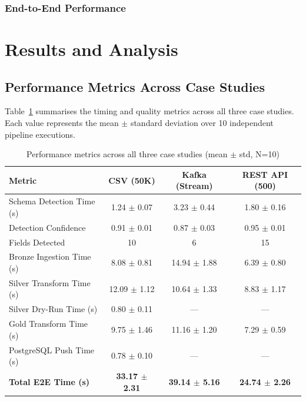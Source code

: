 \documentclass[12pt, a4paper]{article}
\begin{document}
\subsubsection{End-to-End Performance}
\begin{center}
\end{center}


\section{Results and Analysis}

\subsection{Performance Metrics Across Case Studies}

Table~\ref{tab:performance_metrics} summarises the timing and quality metrics across all three case studies. Each value represents the mean $\pm$ standard deviation over 10 independent pipeline executions.

\begin{table}[H]
\centering
\caption{Performance metrics across all three case studies (mean $\pm$ std, N=10)}
\label{tab:performance_metrics}
\renewcommand{\arraystretch}{1.3}
\begin{tabular}{|l|c|c|c|}
\hline
\textbf{Metric} & \textbf{CSV (50K)} & \textbf{Kafka (Stream)} & \textbf{REST API (500)} \\
\hline\hline
Schema Detection Time (s) & 1.24 $\pm$ 0.07 & 3.23 $\pm$ 0.44 & 1.80 $\pm$ 0.16 \\
\hline
Detection Confidence & 0.91 $\pm$ 0.01 & 0.87 $\pm$ 0.03 & 0.95 $\pm$ 0.01 \\
\hline
Fields Detected & 10 & 6 & 15 \\
\hline
Bronze Ingestion Time (s) & 8.08 $\pm$ 0.81 & 14.94 $\pm$ 1.88 & 6.39 $\pm$ 0.80 \\
\hline
Silver Transform Time (s) & 12.09 $\pm$ 1.12 & 10.64 $\pm$ 1.33 & 8.83 $\pm$ 1.17 \\
\hline
Silver Dry-Run Time (s) & 0.80 $\pm$ 0.11 & --- & --- \\
\hline
Gold Transform Time (s) & 9.75 $\pm$ 1.46 & 11.16 $\pm$ 1.20 & 7.29 $\pm$ 0.59 \\
\hline
PostgreSQL Push Time (s) & 0.78 $\pm$ 0.10 & --- & --- \\
\hline\hline
\textbf{Total E2E Time (s)} & \textbf{33.17 $\pm$ 2.31} & \textbf{39.14 $\pm$ 5.16} & \textbf{24.74 $\pm$ 2.26} \\
\hline
\end{tabular}
\end{table}
\end{document}
